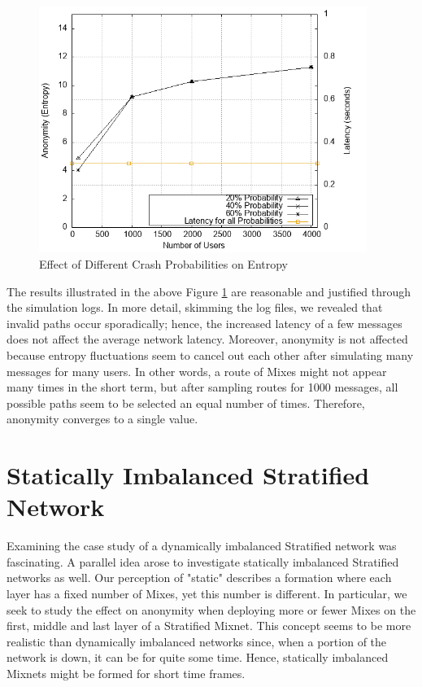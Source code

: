\documentclass[logo,msc,cyber]{infthesis}   %
\begin{document}
\begin{figure}[h!]
    \centering
    \includegraphics[height=8cm]{figures/simulator_extentions/mix_failure.png}
    \caption{Effect of Different Crash Probabilities on Entropy}
    \label{fig:dynamic-crash-probability}
\end{figure}    


The results illustrated in the above Figure \ref{fig:dynamic-crash-probability}
are reasonable and justified through the simulation logs. In more detail,
skimming the log files, we revealed that invalid paths occur sporadically; hence,
the increased latency of a few messages does not affect the average network
latency. Moreover, anonymity is not affected because entropy fluctuations seem
to cancel out each other after simulating many messages for many users. In other
words, a route of Mixes might not appear many times in the short term, but after
sampling routes for 1000 messages, all possible paths seem to be selected an
equal number of times. Therefore, anonymity converges to a single value.

\section{Statically Imbalanced Stratified Network}

Examining the case study of a dynamically imbalanced Stratified network was
fascinating. A parallel idea arose to investigate statically imbalanced
Stratified networks as well. Our perception of "static" describes a formation
where each layer has a fixed number of Mixes, yet this number is different. In
particular, we seek to study the effect on anonymity when deploying more or
fewer Mixes on the first, middle and last layer of a Stratified Mixnet. This
concept seems to be more realistic than dynamically imbalanced networks since,
when a portion of the network is down, it can be for quite some time. Hence,
statically imbalanced Mixnets might be formed for short time frames.
\end{document}
